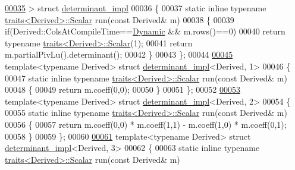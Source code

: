 \begin{DoxyCode}
\hyperlink{struct_eigen_1_1internal_1_1determinant__impl}{00035} > \textcolor{keyword}{struct }\hyperlink{struct_eigen_1_1internal_1_1determinant__impl}{determinant\_impl}
00036 \{
00037   \textcolor{keyword}{static} \textcolor{keyword}{inline} \textcolor{keyword}{typename} \hyperlink{struct_eigen_1_1internal_1_1traits}{traits<Derived>::Scalar} run(\textcolor{keyword}{const} Derived& m)
00038   \{
00039     \textcolor{keywordflow}{if}(Derived::ColsAtCompileTime==\hyperlink{namespace_eigen_ad81fa7195215a0ce30017dfac309f0b2}{Dynamic} && m.rows()==0)
00040       \textcolor{keywordflow}{return} \textcolor{keyword}{typename} \hyperlink{struct_eigen_1_1internal_1_1traits}{traits<Derived>::Scalar}(1);
00041     \textcolor{keywordflow}{return} m.partialPivLu().determinant();
00042   \}
00043 \};
00044 
\hyperlink{struct_eigen_1_1internal_1_1determinant__impl_3_01_derived_00_011_01_4}{00045} \textcolor{keyword}{template}<\textcolor{keyword}{typename} Derived> \textcolor{keyword}{struct }\hyperlink{struct_eigen_1_1internal_1_1determinant__impl}{determinant\_impl}<Derived, 1>
00046 \{
00047   \textcolor{keyword}{static} \textcolor{keyword}{inline} \textcolor{keyword}{typename} \hyperlink{struct_eigen_1_1internal_1_1traits}{traits<Derived>::Scalar} run(\textcolor{keyword}{const} Derived& m)
00048   \{
00049     \textcolor{keywordflow}{return} m.coeff(0,0);
00050   \}
00051 \};
00052 
\hyperlink{struct_eigen_1_1internal_1_1determinant__impl_3_01_derived_00_012_01_4}{00053} \textcolor{keyword}{template}<\textcolor{keyword}{typename} Derived> \textcolor{keyword}{struct }\hyperlink{struct_eigen_1_1internal_1_1determinant__impl}{determinant\_impl}<Derived, 2>
00054 \{
00055   \textcolor{keyword}{static} \textcolor{keyword}{inline} \textcolor{keyword}{typename} \hyperlink{struct_eigen_1_1internal_1_1traits}{traits<Derived>::Scalar} run(\textcolor{keyword}{const} Derived& m)
00056   \{
00057     \textcolor{keywordflow}{return} m.coeff(0,0) * m.coeff(1,1) - m.coeff(1,0) * m.coeff(0,1);
00058   \}
00059 \};
00060 
\hyperlink{struct_eigen_1_1internal_1_1determinant__impl_3_01_derived_00_013_01_4}{00061} \textcolor{keyword}{template}<\textcolor{keyword}{typename} Derived> \textcolor{keyword}{struct }\hyperlink{struct_eigen_1_1internal_1_1determinant__impl}{determinant\_impl}<Derived, 3>
00062 \{
00063   \textcolor{keyword}{static} \textcolor{keyword}{inline} \textcolor{keyword}{typename} \hyperlink{struct_eigen_1_1internal_1_1traits}{traits<Derived>::Scalar} run(\textcolor{keyword}{const} Derived& m)

\end{DoxyCode}
